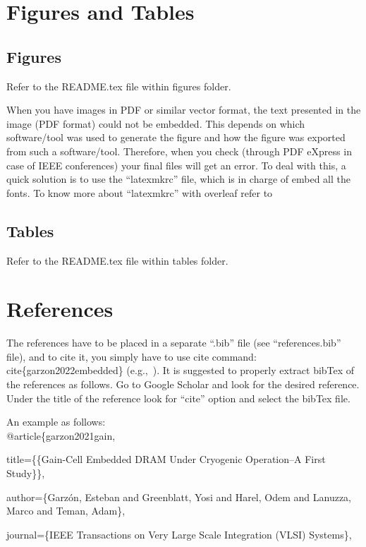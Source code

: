 \documentclass[conference]{IEEEtran}
\begin{document}
\section{Figures and Tables}
\subsection{Figures}
Refer to the README.tex file within figures folder.

When you have images in PDF or similar vector format, the text presented in the image (PDF format) could not be embedded.
This depends on which software/tool was used to generate the figure and how the figure was exported from such a software/tool.
Therefore, when you check (through PDF eXpress in case of IEEE conferences) your final files will get an error.
To deal with this, a quick solution is to use the ``latexmkrc'' file, which is in charge of embed all the fonts.
To know more about ``latexmkrc'' with overleaf refer to \href{https://www.overleaf.com/learn/latex/Articles/How_to_use_latexmkrc_with_Overleaf}{}


\subsection{Tables}
Refer to the README.tex file within tables folder.


\section{References}
The references have to be placed in a separate ``.bib'' file (see ``references.bib'' file), and to cite it, you simply have to use cite command: \arraybackslash \\cite\{garzon2022embedded\} (e.g.,~\cite{garzon2021gain}).
It is suggested to properly extract bibTex of the references as follows.
Go to Google Scholar and look for the desired reference. 
Under the title of the reference look for ``cite'' option and select the bibTex file.

An example as follows:\\

@article\{garzon2021gain,

  title=\{\{Gain-Cell Embedded DRAM Under Cryogenic Operation--A First Study\}\},
  
  author=\{Garz{\'o}n, Esteban and Greenblatt, Yosi and Harel, Odem and Lanuzza, Marco and Teman, Adam\},
  
  journal=\{IEEE Transactions on Very Large Scale Integration (VLSI) Systems\},
  
\end{document}
